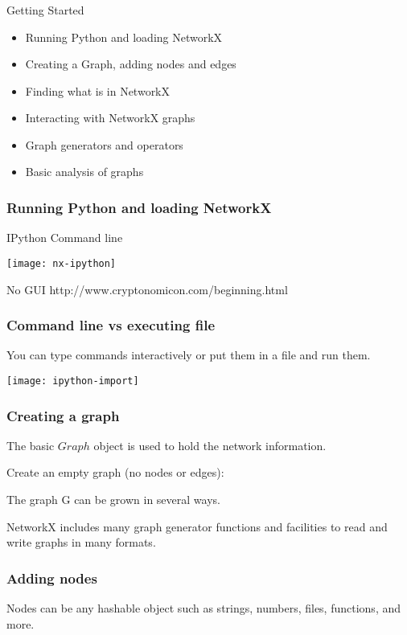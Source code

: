\begin{frame}
\frametitle{}
\begin{center}
{\fontsize{49}{90}\selectfont
{\color{title} Getting Started}}
\end{center}

\begin{itemize}
\item Running Python and loading NetworkX
\item Creating a Graph, adding nodes and edges
\item Finding what is in NetworkX
\item Interacting with NetworkX graphs
\item Graph generators and operators
\item Basic analysis of graphs
\end{itemize}
\end{frame}

\begin{frame}
\frametitle{Running Python and loading NetworkX}
IPython Command line
\centerline{\texttt{[image: nx-ipython]}}
No GUI \footnotesize{http://www.cryptonomicon.com/beginning.html}
\end{frame}

\begin{frame}
\frametitle{Command line vs executing file}
You can type commands interactively or put them in a file and run them.
\centerline{\texttt{[image: ipython-import]}}
\end{frame}

\begin{frame}
\frametitle{Creating a graph}

The basic $Graph$ object is used to hold the network information.

Create an empty graph (no nodes or edges):

\begin{block}{}

\end{block}

The graph G can be grown in several ways.

NetworkX includes many graph generator functions
and facilities to read and write graphs in many formats.
\end{frame}


\begin{frame}[fragile]
\frametitle{Adding nodes}

\begin{block}{}

\end{block}

Nodes can be any hashable object such as strings,
numbers, files, functions, and more.

\end{frame}



